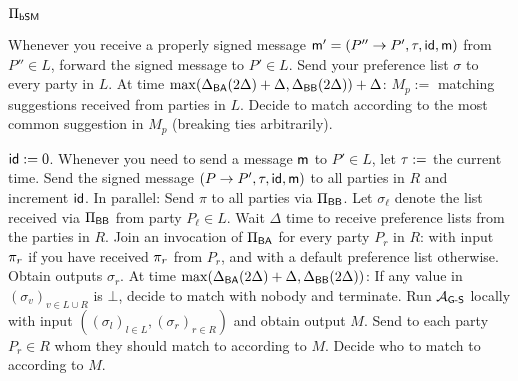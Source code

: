 \begin{protocolbox}{$\Pi_{\textsf{bSM}}$}
\begin{algorithmic}[1]
\State Whenever you receive a properly signed message $\textsf{m}' = (P'' \rightarrow P', \tau, \textsf{id}, \textsf{m})$ from $P'' \in L$, forward the signed message to $P' \in L$.
\State Send your preference list $\sigma$ to every party in $L$.
\State At time $\max(\Delta_{\textsf{BA}}(2\Delta) + \Delta, \Delta_{\textsf{BB}}(2\Delta)) + \Delta$:
\State \hspace{0.5cm} $M_p :=$ matching suggestions received from parties in $L$.
\State \hspace{0.5cm} Decide to match according to the most common suggestion in $M_p$ (breaking ties arbitrarily). 
\end{algorithmic}
\vspace{.5cm}
\begin{algorithmic}[1]
\State $\textsf{id} := 0$. Whenever you need to send a message $\textsf{m}$ to $P' \in L$, let $\tau :=$ the current time. Send the signed message $(P \rightarrow P', \tau, \textsf{id}, \textsf{m})$ to all parties in $R$ and increment $\textsf{id}$.
\State In parallel:
\State \hspace{0.5cm} Send $\pi$ to all parties via $\Pi_{\textsf{BB}}$. Let $\sigma_\ell$ denote the list received via $\Pi_{\textsf{BB}}$ from party $P_{\ell} \in L$.
\State \hspace{0.5cm} Wait $\Delta$ time to receive preference lists from the parties in $R$. Join an invocation of $\Pi_{\textsf{BA}}$ for every party $P_r$ in $R$: with input $\pi_r$ if you have received $\pi_r$ from $P_r$, and with a default preference list otherwise. Obtain outputs $\sigma_r$.
\State At time $\max(\Delta_{\textsf{BA}}(2 \Delta) + \Delta, \Delta_{\textsf{BB}}(2 \Delta))$:
\State \hspace{0.5cm} If any value in $(\sigma_v)_{v \in L \cup R}$ is $\bot$, decide to match with nobody and terminate.
\State \hspace{0.5cm} Run $\mathcal{A}_\textsf{G-S}$ locally with input $\left( (\sigma_l)_{l \in L}, (\sigma_r)_{r \in R} \right)$ and obtain output $M$.
\State \hspace{0.5cm} Send to each party $P_r \in R$ whom they should match to according to $M$.
\State \hspace{0.5cm} Decide who to match to according to $M$.
\end{algorithmic}
\end{protocolbox}



